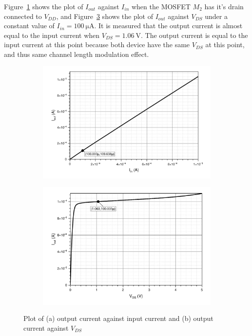 \documentclass[12pt]{article}   %
\begin{document}
	Figure~\ref{fig:ioutIin} shows the plot of $I_{out}$ against $I_{in}$ when the MOSFET $M_2$ has it's drain connected to $V_{DD}$, and Figure~\ref{fig:ioutVds} shows the plot of $I_{out}$ against $V_{DS}$ under a constant value of $I_{in} = \SI{100}{\micro\ampere}$. It is measured that the output current is almost equal to the input current when $V_{DS} = \SI{1.06}{\volt}$. The output current is equal to the input current at this point because both device have the same $V_{DS}$ at this point, and thus same channel length modulation effect.
	
	\begin{figure}[htbp]
		\centering
		\begin{subfigure}{0.48\linewidth}
			\includegraphics[width=\linewidth]{Figures/E3_Current_Mirror/Iin_Iout}
			\caption{}
			\label{fig:ioutIin}
		\end{subfigure}
		\begin{subfigure}{0.48\linewidth}
			\includegraphics[width=\linewidth]{Figures/E3_Current_Mirror/Iout_Vds}
			\caption{}
			\label{fig:ioutVds}
		\end{subfigure}
		\caption{Plot of (a) output current against input current and (b) output current against $V_{DS}$}
	\end{figure}
	
\end{document}
